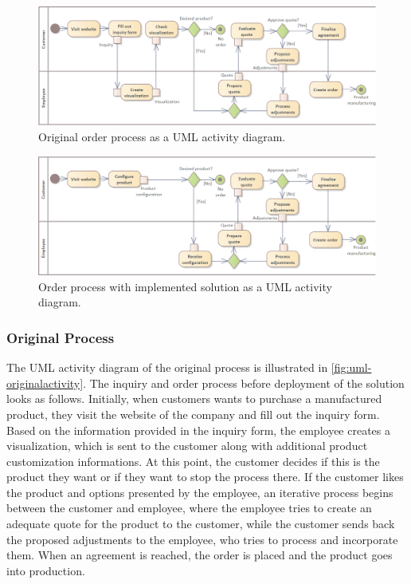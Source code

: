 \begin{landscape}
\begin{figure}[h!]
\centering
\includegraphics[width=0.67\linewidth]{images/uml_originalactivity.png}
\caption{Original order process as a UML activity diagram.}
\label{fig:uml-originalactivity}
\end{figure}
\begin{figure}[h!]
\centering
\includegraphics[width=0.67\linewidth]{images/uml_newactivity.png}
\caption{Order process with implemented solution as a UML activity diagram.}
\label{fig:uml-newactivity}
\end{figure}
\end{landscape}


\subsubsection{Original Process}


The UML activity diagram of the original process is illustrated in \autoref{fig:uml-originalactivity}. The inquiry and order process before deployment of the solution looks as follows. Initially, when customers wants to purchase a manufactured product, they visit the website of the company and fill out the inquiry form. Based on the information provided in the inquiry form, the employee creates a visualization, which is sent to the customer along with additional product customization informations. At this point, the customer decides if this is the product they want or if they want to stop the process there. If the customer likes the product and options presented by the employee, an iterative process begins between the customer and employee, where the employee tries to create an adequate quote for the product to the customer, while the customer sends back the proposed adjustments to the employee, who tries to process and incorporate them. When an agreement is reached, the order is placed and the product goes into production. 


